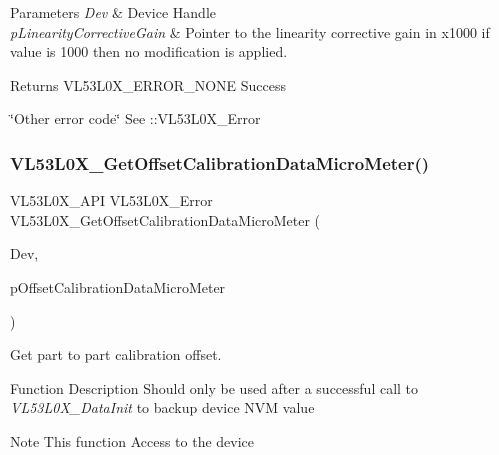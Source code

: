 \begin{DoxyParams}{Parameters}
{\em Dev} & Device Handle \\
\hline
{\em p\+Linearity\+Corrective\+Gain} & Pointer to the linearity corrective gain in x1000 if value is 1000 then no modification is applied. \\
\hline
\end{DoxyParams}
\begin{DoxyReturn}{Returns}
V\+L53\+L0\+X\+\_\+\+E\+R\+R\+O\+R\+\_\+\+N\+O\+NE Success 

\char`\"{}\+Other error code\char`\"{} See \+::\+V\+L53\+L0\+X\+\_\+\+Error 
\end{DoxyReturn}
\mbox{\label{group__VL53L0X__general__group_ga724ec9400a6d5667e10bda476cc43029}} 
\subsubsection{\texorpdfstring{V\+L53\+L0\+X\+\_\+\+Get\+Offset\+Calibration\+Data\+Micro\+Meter()}{VL53L0X\_GetOffsetCalibrationDataMicroMeter()}}
{\footnotesize\ttfamily V\+L53\+L0\+X\+\_\+\+A\+PI V\+L53\+L0\+X\+\_\+\+Error V\+L53\+L0\+X\+\_\+\+Get\+Offset\+Calibration\+Data\+Micro\+Meter (\begin{DoxyParamCaption}\item[{\hyperlink{group__VL53L0X__platform__group_ga2d6405308b1dd524b462f1b8fb97d167}{V\+L53\+L0\+X\+\_\+\+D\+EV}}]{Dev,  }\item[{\hyperlink{vl53l0x__types_8h_a32f2e37ee053cf2ce8ca28d1f74630e5}{int32\+\_\+t} $\ast$}]{p\+Offset\+Calibration\+Data\+Micro\+Meter }\end{DoxyParamCaption})}



Get part to part calibration offset. 

\begin{DoxyParagraph}{Function Description}
Should only be used after a successful call to {\itshape V\+L53\+L0\+X\+\_\+\+Data\+Init} to backup device N\+VM value
\end{DoxyParagraph}
\begin{DoxyNote}{Note}
This function Access to the device
\end{DoxyNote}

